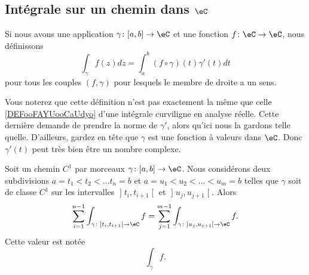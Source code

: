 \subsection{Intégrale sur un chemin dans \( \eC\)}

\begin{definition}      \label{DEFooBPLJooZwsmxi}
	Si nous avons une application \( \gamma\colon \mathopen[ a , b \mathclose]\to \eC\) et une fonction \( f\colon \eC\to \eC\), nous définissons
	\begin{equation}
		\int_{\gamma}f(z)dz=\int_a^b(f\circ \gamma)(t)\gamma'(t)dt
	\end{equation}
	pour tous les couples \( (f,\gamma)\) pour lesquels le membre de droite a un sens.
\end{definition}

\begin{normaltext}
    Vous noterez que cette définition n'est pas exactement la même que celle \ref{DEFooFAYUooCaUdyo} d'une intégrale curviligne en analyse réelle. Cette dernière demande de prendre la norme de \( \gamma'\), alors qu'ici nous la gardons telle quelle. D'ailleurs, gardez en tête que \( \gamma\) est une fonction à valeurs dans \( \eC\). Donc \( \gamma'(t)\) peut très bien être un nombre complexe.
\end{normaltext}

\begin{propositionDef}       \label{PROPooCUBTooZDcdHX}
    Soit un chemin \( C^1\) par morceaux \( \gamma\colon \mathopen[ a , b \mathclose]\to \eC\). Nous considérons deux subdivisions \( a=t_1<t_2<\ldots t_n=b\) et \( a=u_1<u_2<\ldots <u_m=b\) telles que \( \gamma\) soit de classe \( C^1\) sur les intervalles \( \mathopen] t_i , t_{i+1} \mathclose[\) et \( \mathopen] u_j , u_{j+1} \mathclose[\). Alors
    \begin{equation}
        \sum_{i=1}^{n-1}\int_{\gamma\colon \mathopen] t_i , t_{i+1} \mathclose[\to \eC}f= \sum_{j=1}^{m-1}\int_{\gamma\colon \mathopen] u_j , u_{j+1} \mathclose[\to \eC}f.
    \end{equation}
    Cette valeur est notée
    \begin{equation}
        \int_{\gamma}f.
    \end{equation}
\end{propositionDef}

